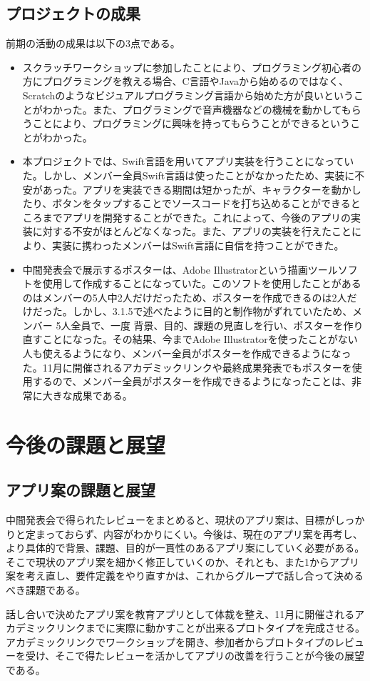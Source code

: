 \documentclass[openany,11pt,papersize]{jsbook}
\begin{document}
\section{プロジェクトの成果}
\par 前期の活動の成果は以下の3点である。
\begin{itemize}
\item スクラッチワークショップに参加したことにより、プログラミング初心者の方にプログラミングを教える場合、C言語やJavaから始めるのではなく、Scratchのようなビジュアルプログラミング言語から始めた方が良いということがわかった。また、プログラミングで音声機器などの機械を動かしてもらうことにより、プログラミングに興味を持ってもらうことができるということがわかった。
\item 
本プロジェクトでは、Swift言語を用いてアプリ実装を行うことになっていた。しかし、メンバー全員Swift言語は使ったことがなかったため、実装に不安があった。アプリを実装できる期間は短かったが、キャラクターを動かしたり、ボタンをタップすることでソースコードを打ち込めることができるところまでアプリを開発することができた。これによって、今後のアプリの実装に対する不安がほとんどなくなった。また、アプリの実装を行えたことにより、実装に携わったメンバーはSwift言語に自信を持つことができた。

\item 中間発表会で展示するポスターは、Adobe Illustratorという描画ツールソフトを使用して作成することになっていた。このソフトを使用したことがあるのはメンバーの5人中2人だけだったため、ポスターを作成できるのは2人だけだった。しかし、3.1.5で述べたように目的と制作物がずれていたため、メンバー 5人全員で、一度 背景、目的、課題の見直しを行い、ポスターを作り直すことになった。その結果、今までAdobe Illustratorを使ったことがない人も使えるようになり、メンバー全員がポスターを作成できるようになった。11月に開催されるアカデミックリンクや最終成果発表でもポスターを使用するので、メンバー全員がポスターを作成できるようになったことは、非常に大きな成果である。
\end{itemize}




\chapter{今後の課題と展望}
\section{アプリ案の課題と展望}
中間発表会で得られたレビューをまとめると、現状のアプリ案は、目標がしっかりと定まっておらず、内容がわかりにくい。今後は、現在のアプリ案を再考し、より具体的で背景、課題、目的が一貫性のあるアプリ案にしていく必要がある。そこで現状のアプリ案を細かく修正していくのか、それとも、また1からアプリ案を考え直し、要件定義をやり直すかは、これからグループで話し合って決めるべき課題である。
\par
話し合いで決めたアプリ案を教育アプリとして体裁を整え、11月に開催されるアカデミックリンクまでに実際に動かすことが出来るプロトタイプを完成させる。アカデミックリンクでワークショップを開き、参加者からプロトタイプのレビューを受け、そこで得たレビューを活かしてアプリの改善を行うことが今後の展望である。
\end{document}
